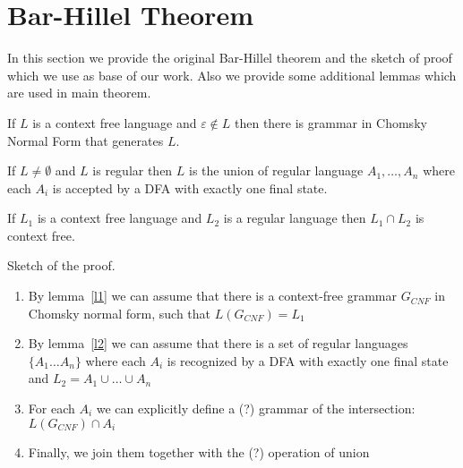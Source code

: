 \section{Bar-Hillel Theorem}

In this section we provide the original Bar-Hillel theorem and the sketch of proof which we use as base of our work.
Also we provide some additional lemmas which are used in main theorem.

\begin{lemma} \label{l1}
	If $L$ is a context free language and $\varepsilon \notin L$ then there is grammar in Chomsky Normal Form that generates $L$.
\end{lemma}

\begin{lemma} \label{l2}
	If $ L \neq \emptyset $ and $L$ is regular then $L$ is the union of regular language $A_1, \ldots , A_n$ where each $A_i$ is accepted by a DFA with exactly one final state.
\end{lemma}

\begin{theorem}
	If $L_1$ is a context free language and $L_2$ is a regular language then $L_1 \cap L_2$ is context free.
\end{theorem}


Sketch of the proof.
\begin{enumerate}
	\item By lemma~\ref{l1} we can assume that there is a context-free grammar $G_{CNF}$ in Chomsky normal form, such that $L(G_{CNF}) = L_1$
	\item By lemma~\ref{l2} we can assume that there is a set of regular languages $\{A_{1} \ldots A_n \}$ where each $A_i$ is recognized by a DFA with exactly one final state and $L_2 = A_1 \cup \ldots \cup A_n$ 
	\item For each $A_i$ we can explicitly define a (?) grammar of the intersection: $L( G_{CNF} ) \cap A_i$
	\item Finally, we join them together with the (?) operation of union
\end{enumerate}
